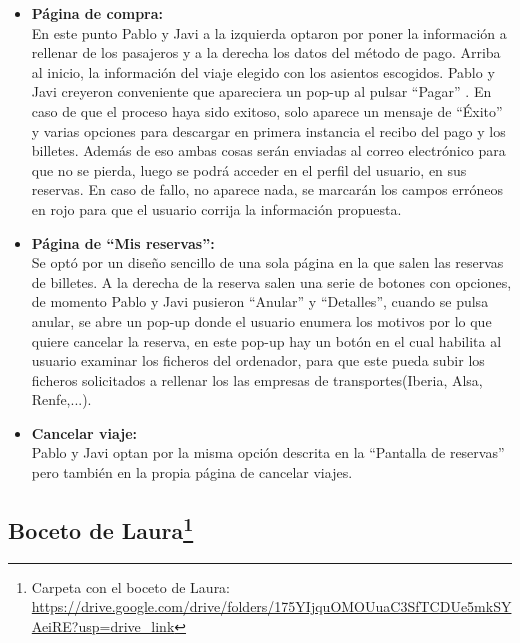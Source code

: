 \begin{itemize}
    \item\textbf{Página de compra:} \\ En este punto Pablo y Javi a la izquierda optaron por poner la información a rellenar de los pasajeros y a la derecha los datos del método de pago. Arriba al inicio, la información del viaje elegido con los asientos escogidos. Pablo y Javi creyeron conveniente que apareciera un pop-up al pulsar ``Pagar'' . En caso de que el proceso haya sido exitoso, solo aparece un mensaje de ``Éxito'' y varias opciones para descargar en primera instancia el recibo del pago y los billetes. Además de eso ambas cosas serán enviadas al correo electrónico para que no se pierda, luego se podrá acceder en el perfil del usuario, en sus reservas. En caso de fallo, no aparece nada, se marcarán los campos erróneos en rojo para que el usuario corrija la información propuesta.
    \item\textbf{Página de ``Mis reservas'':} \\ Se optó por un diseño sencillo de una sola página en la que salen las reservas de billetes. A la derecha de la reserva salen una serie de botones con opciones, de momento Pablo y Javi pusieron ``Anular'' y ``Detalles'', cuando se pulsa anular, se abre un pop-up donde el usuario enumera los motivos por lo que quiere cancelar la reserva, en este pop-up hay un botón en el cual habilita al usuario examinar los ficheros del ordenador, para que este pueda subir los ficheros solicitados a rellenar los las empresas de transportes(Iberia, Alsa, Renfe,...).

    \item\textbf{Cancelar viaje:} \\ Pablo y Javi optan por la misma opción descrita en la “Pantalla de reservas” pero también en la propia página de cancelar viajes.
\end{itemize}

\subsection[Boceto de Laura]{Boceto de Laura\footnote{Carpeta con el boceto de Laura: \url{https://drive.google.com/drive/folders/175YIjquOMOUuaC3SfTCDUe5mkSYAeiRE?usp=drive_link}}}

